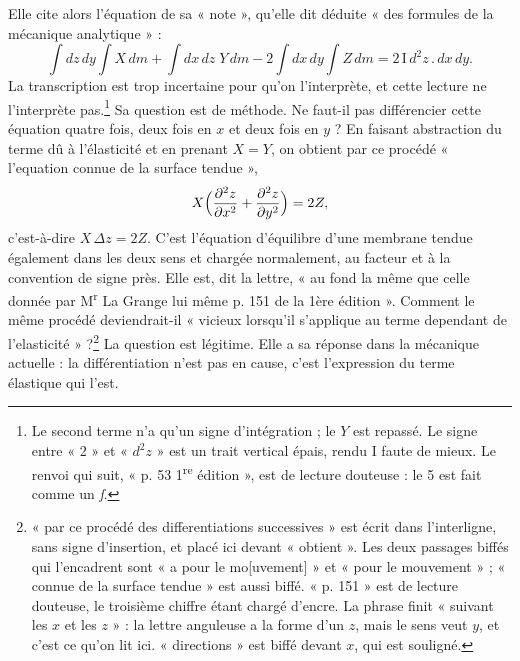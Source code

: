 \documentclass[11pt,a4paper]{article}
\begin{document}
Elle cite alors l'équation de sa « note », qu'elle dit déduite « des formules
de la mécanique analytique » :
\[
\int dz\,dy\int X\,dm+\int dx\,dz\;Y\,dm-2\int dx\,dy\int Z\,dm=2\,\mathrm{I}\,d^2z\,.\,dx\,dy .
\]
La transcription est trop incertaine pour qu'on l'interprète, et cette lecture
ne l'interprète pas.\footnote{Le second terme n'a qu'un signe d'intégration ;
le \(Y\) est repassé. Le signe entre « 2 » et « \(d^2z\) » est un trait
vertical épais, rendu \(\mathrm I\) faute de mieux. Le renvoi qui suit,
« p. 53 1\textsuperscript{re} édition », est de lecture douteuse : le 5 est
fait comme un \emph{ſ}.} Sa question est de méthode. Ne faut-il pas
différencier cette équation quatre fois, deux fois en \(x\) et deux fois en
\(y\) ? En faisant abstraction du terme dû à l'élasticité et en prenant
\(X=Y\), on obtient par ce procédé « l'equation connue de la surface tendue »,
\[
X\Bigl(\frac{\partial^2z}{\partial x^2}+\frac{\partial^2z}{\partial y^2}\Bigr)=2Z,
\]
c'est-à-dire \(X\,\Delta z=2Z\). C'est l'équation d'équilibre d'une membrane
tendue également dans les deux sens et chargée normalement, au facteur et à
la convention de signe près. Elle est, dit la lettre, « au fond la même que
celle donnée par M\textsuperscript{r} La Grange lui même p. 151 de la 1ère
édition ». Comment le même procédé deviendrait-il « vicieux lorsqu'il
s'applique au terme dependant de l'elasticité » ?\footnote{« par ce procédé
des differentiations successives » est écrit dans l'interligne, sans signe
d'insertion, et placé ici devant « obtient ». Les deux passages biffés qui
l'encadrent sont « a pour le mo[uvement] » et « pour le mouvement » ; « connue
de la surface tendue » est aussi biffé. « p. 151 » est de lecture douteuse,
le troisième chiffre étant chargé d'encre. La phrase finit « suivant les \(x\)
et les \(z\) » : la lettre anguleuse a la forme d'un \(z\), mais le sens veut
\(y\), et c'est ce qu'on lit ici. « directions » est biffé devant \(x\), qui
est souligné.} La question est légitime. Elle a sa réponse dans la mécanique
actuelle : la différentiation n'est pas en cause, c'est l'expression du terme
élastique qui l'est.
\end{document}
